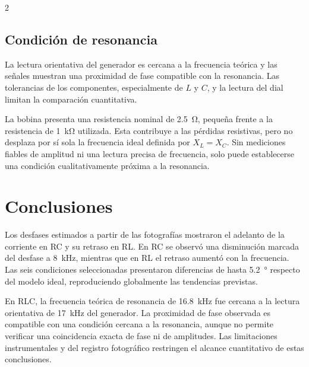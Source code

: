 \documentclass[10pt,letterpaper]{article}
\begin{document}
\begin{multicols}{2}
\subsection{Condición de resonancia}

La lectura orientativa del generador es cercana a la frecuencia teórica y las señales muestran una proximidad de fase compatible con la resonancia. Las tolerancias de los componentes, especialmente de $L$ y $C$, y la lectura del dial limitan la comparación cuantitativa.

La bobina presenta una resistencia nominal de \SI{2.5}{\ohm}, pequeña frente a la resistencia de \SI{1}{\kilo\ohm} utilizada. Esta contribuye a las pérdidas resistivas, pero no desplaza por sí sola la frecuencia ideal definida por $X_L=X_C$. Sin mediciones fiables de amplitud ni una lectura precisa de frecuencia, solo puede establecerse una condición cualitativamente próxima a la resonancia.


\section{Conclusiones}

Los desfases estimados a partir de las fotografías mostraron el adelanto de la corriente en RC y su retraso en RL. En RC se observó una disminución marcada del desfase a \SI{8}{\kilo\hertz}, mientras que en RL el retraso aumentó con la frecuencia. Las seis condiciones seleccionadas presentaron diferencias de hasta \SI{5.2}{\degree} respecto del modelo ideal, reproduciendo globalmente las tendencias previstas.

En RLC, la frecuencia teórica de resonancia de \SI{16.8}{\kilo\hertz} fue cercana a la lectura orientativa de \SI{17}{\kilo\hertz} del generador. La proximidad de fase observada es compatible con una condición cercana a la resonancia, aunque no permite verificar una coincidencia exacta de fase ni de amplitudes. Las limitaciones instrumentales y del registro fotográfico restringen el alcance cuantitativo de estas conclusiones.



\end{multicols}
\end{document}
